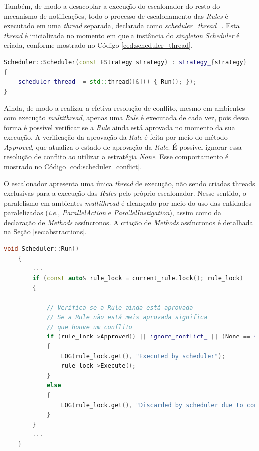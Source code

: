 Também, de modo a desacoplar a execução do escalonador do resto do mecanismo de
notificações, todo o processo de escalonamento das \textit{Rules} é executado 
em uma \textit{thread} separada, declarada como \textit{scheduler\_thread\_}. Esta
\textit{thread} é inicializada no momento em que a instância do \textit{singleton}
\textit{Scheduler} é criada, conforme mostrado no Código \ref{cod:scheduler_thread}.

\begin{lstlisting}[language=C++, float=htb,
caption = {Inicialização da \textit{thread} do \textit{Scheduler}
no \textit{Framework} PON C++ 4.0},
source = {Autoria própria}, label = {cod:scheduler_thread}]
Scheduler::Scheduler(const EStrategy strategy) : strategy_{strategy}
{
    scheduler_thread_ = std::thread([&]() { Run(); });
}
\end{lstlisting}

Ainda, de modo a realizar a efetiva resolução de conflito, mesmo em ambientes com
execução \textit{multithread}, apenas uma \textit{Rule} é executada de cada vez,
pois dessa forma é possível verificar se a \textit{Rule} ainda está aprovada no
momento da sua execução. A verificação da aprovação da \textit{Rule} é feita por
meio do método \textit{Approved}, que atualiza o estado de aprovação da
\textit{Rule}. É possível ignorar essa resolução de conflito ao utilizar a
estratégia \textit{None}. Esse comportamento é mostrado no Código
\ref{cod:scheduler_conflict}.

O escalonador apresenta uma única \textit{thread} de execução, não sendo
criadas threads exclusivas para a execução das \textit{Rules} pelo próprio
escalonador. Nesse sentido, o paralelismo em ambientes \textit{multithread} é
alcançado por meio do uso das entidades paralelizadas (\textit{i.e.},
\textit{ParallelAction} e \textit{ParallelInstigation}), assim como da
declaração de \textit{Methods} assíncronos. A criação de \textit{Methods}
assíncronos é detalhada na Seção \ref{sec:abstractions}.

\begin{lstlisting}[language=C++, float=htb,
    caption = {Detalhe
    do mecanismo de resolução de conflito da classe \textit{Scheduler}
    no \textit{Framework} PON C++ 4.0},
    source = {Autoria própria}, label = {cod:scheduler_conflict}]
    void Scheduler::Run()
    {
        ...
        if (const auto& rule_lock = current_rule.lock(); rule_lock)
        {
            
            // Verifica se a Rule ainda está aprovada
            // Se a Rule não está mais aprovada significa
            // que houve um conflito
            if (rule_lock->Approved() || ignore_conflict_ || (None == strategy_))
            {
                LOG(rule_lock.get(), "Executed by scheduler");
                rule_lock->Execute();
            }
            else
            {
                LOG(rule_lock.get(), "Discarded by scheduler due to conflict");
            }
        }
        ...
    }
    \end{lstlisting}

